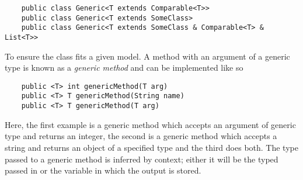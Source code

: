 \documentclass[12pt]{report}
\begin{document}
\begin{flushleft}
\begin{lstlisting}
    public class Generic<T extends Comparable<T>>
    public class Generic<T extends SomeClass>
    public class Generic<T extends SomeClass & Comparable<T> & List<T>>
\end{lstlisting}

To ensure the class fits a given model. A method with an argument of a generic
type is known as a \textit{generic method} and can be implemented like so

\begin{lstlisting}
    public <T> int genericMethod(T arg)
    public <T> T genericMethod(String name)
    public <T> T genericMethod(T arg)
\end{lstlisting}

Here, the first example is a generic method which accepts an argument of
generic type and returns an integer, the second is a generic method which
accepts a string and returns an object of a specified type and the third does
both. The type passed to a generic method is inferred by context; either it
will be the typed passed in or the variable in which the output is stored.

\end{flushleft}
\end{document}
